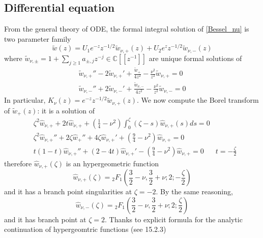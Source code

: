\documentclass{article}
\newcommand{\C}{\mathbb{C}}
\begin{document}
\subsection{Differential equation}
From the general theory of ODE, the formal integral solution of \eqref{Bessel_nu} is two parameter family 
\begin{equation}
\tilde{w}(z)=U_1e^{-z}z^{-1/2}\tilde{w}_{\nu,+}(z)+U_2e^{z}z^{-1/2}\tilde{w}_{\nu,-}(z)
\end{equation} 
where $\tilde{w}_{\nu,\pm}=1+\sum_{j\geq 1}a_{\pm,j}z^{-j}\in\C[\![z^{-1}]\!]$ are unique formal solutions of
\begin{align*}
\tilde{w}_{\nu,+}''-2\tilde{w}_{\nu,+}'+\frac{\tilde{w}_+}{4z^2}-\frac{\nu^2}{z^2}\tilde{w}_{\nu,+}=0\\
\tilde{w}_{\nu,-}''+2\tilde{w}_{\nu,-}'+\frac{\tilde{w}_{\nu,-}}{4z^2}-\frac{\nu^2}{z^2}\tilde{w}_{\nu,-}=0
\end{align*} 
In particular, $K_{\nu}(z)=e^{-z}z^{-1/2}\tilde{w}_{\nu,+}(z)$. We now compute the Borel transform of $\tilde{w}_+(z)$: it is a solution of 
\begin{align*}
&\zeta^2\hat{w}_{\nu,+}+2t\hat{w}_{\nu,+}+\left(\frac{1}{4}-\nu^2\right)\int_0^{\zeta}(\zeta-s)\hat{w}_{\nu,+}(s)ds=0 &\\
&\zeta^2\hat{w}_{\nu,+}''+2\zeta\hat{w}_+''+4\zeta\hat{w}_{\nu,+}'+\left(\frac{9}{4}-\nu^2\right)\hat{w}_{\nu,+}=0 & \\
&t(1-t)\hat{w}_{\nu,+}''+(2-4t)\hat{w}_{\nu,+}'-\left(\frac{9}{4}-\nu^2\right)\hat{w}_{\nu,+}=0 & t=-\frac{\zeta}{2}
\end{align*} 
therefore $\hat{w}_{\nu,+}(\zeta)$ is an hypergeometric function
\begin{equation}
\hat{w}_{\nu,+}(\zeta)={}_2F_1\left(\frac{3}{2}-\nu,\frac{3}{2}+\nu;2;-\frac{\zeta}{2}\right)
\end{equation}
and it has a branch point singularities at $\zeta=-2$. By the same reasoning, 
\begin{equation}
\hat{w}_{\nu,-}(\zeta)={}_2F_1\left(\frac{3}{2}-\nu,\frac{3}{2}+\nu;2;\frac{\zeta}{2}\right)
\end{equation} 
and it has branch point at $\zeta=2$. Thanks to explicit formula for the analytic continuation of hypergeomtric functions (see \cite{dlmf} 15.2.3)
\end{document}
